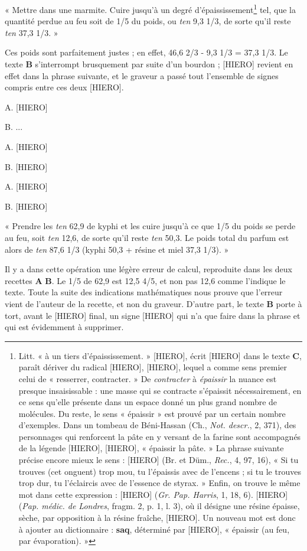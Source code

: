 \documentclass[a4paper, 11pt, oneside]{article}
\begin{document}
« Mettre dans une marmite. Cuire jusqu'à un degré d'épaississement\footnote{Litt. « à un tiers d'épaississement. » [HIERO], écrit [HIERO] dans le texte \textbf{C}, paraît dériver du radical [HIERO], [HIERO], lequel a comme sens premier celui de « resserrer, contracter. » De \emph{contracter} à \emph{épaissir} la nuance est presque insaisissable : une masse qui se contracte s'épaissit nécessairement, en ce sens qu'elle présente dans un espace donné un plus grand nombre de molécules. Du reste, le sens « épaissir » est prouvé par un certain nombre d'exemples. Dans un tombeau de Béni-Hassan (Ch., \emph{Not. descr.}, 2, 371), des personnages qui renforcent la pâte en y versant de la farine sont accompagnés de la légende [HIERO], [HIERO], « épaissir la pâte. » La phrase suivante précise encore mieux le sens : [HIERO] (Br. et Düm., \emph{Rec.}, 4, 97, 16), « Si tu trouves (cet onguent) trop mou, tu l'épaissis avec de l'encens ; si tu le trouves trop dur, tu l'éclaircis avec de l'essence de styrax. » Enfin, on trouve le même mot dans cette expression : [HIERO] (\emph{Gr. Pap. Harris}, 1, 18, 6). [HIERO] (\emph{Pap. médic. de Londres}, fragm. 2, p. 1, l. 3), où il désigne une résine épaisse, sèche, par opposition à la résine fraîche, [HIERO]. Un nouveau mot est donc à ajouter au dictionnaire : \textbf{saq}, déterminé par [HIERO], « épaissir (au feu, par évaporation). »} tel, que la quantité perdue au feu soit de 1/5 du poids, ou \emph{ten} 9,3 1/3, de sorte qu'il reste \emph{ten} 37,3 1/3. »

Ces poids sont parfaitement justes ; en effet, 46,6 2/3 - 9,3 1/3 = 37,3 1/3. Le texte \textbf{B} s'interrompt brusquement par suite d'un bourdon ; [HIERO] revient en effet dans la phrase suivante, et le graveur a passé tout l'ensemble de signes compris entre ces deux [HIERO]. 

A. [HIERO]

B. ...

A. [HIERO]

B. [HIERO]

A. [HIERO]

B. [HIERO]

« Prendre les \emph{ten} 62,9 de kyphi et les cuire jusqu'à ce que 1/5 du poids se perde au feu, soit \emph{ten} 12,6, de sorte qu'il reste \emph{ten} 50,3. Le poids total du parfum est alors de \emph{ten} 87,6 1/3 (kyphi 50,3 + résine et miel 37,3 1/3). »

Il y a dans cette opération une légère erreur de calcul, reproduite dans les deux recettes \textbf{A} \textbf{B}. Le 1/5 de 62,9 est 12,5 4/5, et non pas 12,6 comme l'indique le texte. Toute la suite des indications mathématiques nous prouve que l'erreur vient de l'auteur de la recette, et non du graveur. D'autre part, le texte \textbf{B} porte à tort, avant le [HIERO] final, un signe [HIERO] qui n'a que faire dans la phrase et qui est évidemment à supprimer.
\end{document}
